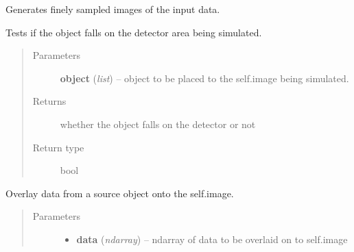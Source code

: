 \documentclass[a4paper,11pt,english]{sphinxmanual}
\begin{document}
\begin{fulllineitems}
\begin{fulllineitems}
\end{fulllineitems}


\begin{fulllineitems}
\label{simulator:simulator.simulator.VISsimulator.generateFinemaps}
Generates finely sampled images of the input data.

\end{fulllineitems}


\begin{fulllineitems}
\label{simulator:simulator.simulator.VISsimulator.objectOnDetector}
Tests if the object falls on the detector area being simulated.
\begin{quote}\begin{description}
\item[{Parameters}] \leavevmode
\textbf{object} (\emph{list}) -- object to be placed to the self.image being simulated.

\item[{Returns}] \leavevmode
whether the object falls on the detector or not

\item[{Return type}] \leavevmode
bool

\end{description}\end{quote}

\end{fulllineitems}


\begin{fulllineitems}
\label{simulator:simulator.simulator.VISsimulator.overlayToCCD}
Overlay data from a source object onto the self.image.
\begin{quote}\begin{description}
\item[{Parameters}] \leavevmode\begin{itemize}
\item {} 
\textbf{data} (\emph{ndarray}) -- ndarray of data to be overlaid on to self.image


\end{itemize}
\end{description}
\end{quote}
\end{fulllineitems}
\end{fulllineitems}
\end{document}
